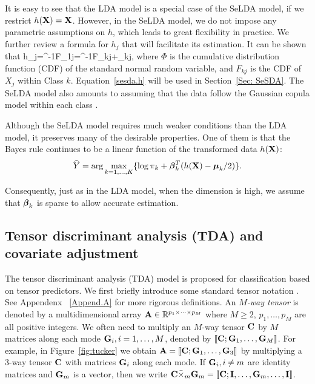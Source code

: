 It is easy to see that the LDA model is a special case of the SeLDA model, if we restrict $h(\mathbf{X})=\mathbf{X}$. However, in the SeLDA model, we do not impose any parametric assumptions on $h$, which leads to great flexibility in practice. We further review a formula for $h_j$ that will facilitate its estimation. It can be shown that 
\beq\label{sesda.h}
h_j=\Phi^{-1}\circ F_{1j}=\Phi^{-1}\circ F_{kj}+\mu_{kj},
\eeq
where $\Phi$ is the cumulative distribution function (CDF) of the standard normal random variable, and $F_{kj}$ is the CDF of $X_j$ within Class $k$. Equation~\eqref{sesda.h} will be used in Section~\ref{Sec: SeSDA}. The SeLDA model also amounts to assuming that the data follow the Gaussian copula model within each class \citep{wellner1997,HNW14,SemiCov}. 





Although the SeLDA model requires much weaker conditions than the LDA model, it preserves many of the desirable properties. One of them is that the Bayes rule continues to be a linear function of the transformed data $h(\mathbf{X})$:
\begin{equation}\label{seldabayes}
\widehat{Y}=\arg\max_{k=1,\dots,K}\{\log\pi_{k}+\boldsymbol{\beta}_k^T(h(\mathbf{X})-\boldsymbol{\mu}_k/2)\}.
\end{equation}


Consequently, just as in the LDA model, when the dimension is high, we assume that $\boldsymbol{\beta}_k$ is sparse to allow accurate estimation.



\subsection{Tensor discriminant analysis (TDA) and covariate adjustment} \label{Sec: CATCH}


The tensor discriminant analysis (TDA) model is proposed for classification based on tensor predictors. We first briefly introduce some standard tensor notation \citep{KoldaBader09Tensor}. See Appendenx ~\ref{Append.A} for more rigorous definitions. An \emph{$M$-way tensor} is denoted by a multidimensional array $\mathbf{A}\in \mathbb{R}^{p_{1}\times\cdots\times p_{M}}$ where $M\geq2$, $p_1,\ldots,p_M$ are all positive integers. We often need to multiply an $M$-way tensor $\mathbf{C}$ by $M$ matrices along each mode $\mathbf{G}_i,i=1,\ldots,M$, denoted by $\llbracket \mathbf{C};\mathbf{G}_1,\ldots,\mathbf{G}_M\rrbracket$. For example, in Figure~\ref{fig:tucker} we obtain $\mathbf{A}=\llbracket \mathbf{C};\mathbf{G}_1,\ldots,\mathbf{G}_3\rrbracket$ by multiplying a 3-way tensor $\mathbf{C}$ with matrices $\mathbf{G}_i$ along each mode. If $\mathbf{G}_i,i\ne m$ are identity matrices and $\mathbf{G}_m$ is a vector, then we write $\mathbf{C}\bar{\times}_{m}\mathbf{G}_m=\llbracket\mathbf{C};\mathbf{I},\ldots,\mathbf{G}_m,\ldots,\mathbf{I}\rrbracket$.


